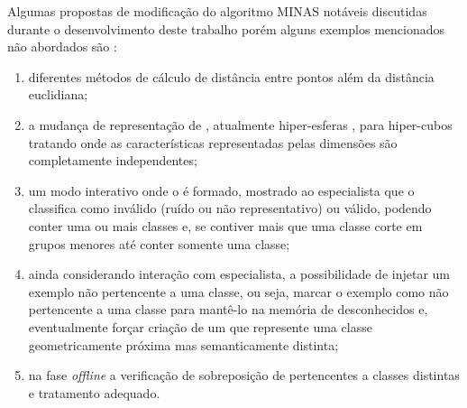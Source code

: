 Algumas propostas de modificação do algoritmo MINAS notáveis discutidas durante o desenvolvimento
deste trabalho 
porém alguns exemplos mencionados não abordados são \cite{DaSilva2018,DaSilva2018thesis,Costa2019}:

\begin{enumerate}[label={\alph*)}]
    
    \item diferentes métodos de cálculo de distância entre pontos além da
    distância euclidiana;
    
    \item a mudança de representação de \clusters, atualmente hiper-esferas
    \cite{Costa2019thesis}, para hiper-cubos tratando \datasets onde as
    características representadas pelas dimensões são completamente
    independentes;
    
    \item um modo interativo onde o \cluster é formado, mostrado ao especialista
    que o classifica como inválido (ruído ou não representativo) ou válido,
    podendo conter uma ou mais classes e, se contiver mais que uma classe corte em
    grupos menores até conter somente uma classe;
    
    \item ainda considerando interação com especialista, a possibilidade de
    injetar um exemplo não pertencente a uma classe, ou seja, marcar o exemplo
    como não pertencente a uma classe para mantê-lo na memória de
    desconhecidos e, eventualmente forçar criação de um \cluster que represente
    uma classe geometricamente próxima mas semanticamente distinta;
    
    \item na fase \emph{offline} a verificação de sobreposição de \clusters
    pertencentes a classes distintas e tratamento adequado.

\end{enumerate}
